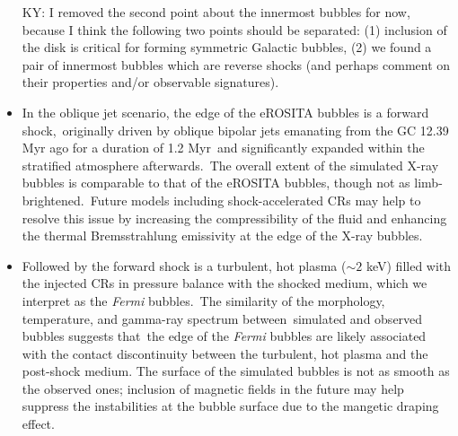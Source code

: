 \documentclass[fleqn,usenatbib,useAMS]{mnras}
\begin{document}
\begin{itemize}
      {\color{red} KY: I removed the second point about the innermost bubbles for now, because I think the following two points should be separated: (1) inclusion of the disk is critical for forming symmetric Galactic bubbles, (2) we found a pair of innermost bubbles which are reverse shocks (and perhaps comment on their properties and/or observable signatures).}
\item In the oblique jet scenario, the edge of the eROSITA bubbles is a forward shock,\
      originally driven by oblique bipolar jets emanating from the GC 12.39 Myr ago for a duration of 1.2 Myr\
      and significantly expanded within the stratified atmosphere afterwards.\
      The overall extent of the simulated X-ray bubbles is comparable to that of the eROSITA bubbles, though not as limb-brightened.\
      Future models including shock-accelerated CRs may help to resolve this issue by increasing the compressibility of the fluid and enhancing the thermal Bremsstrahlung emissivity at the edge of the X-ray bubbles.
\item Followed by the forward shock is a turbulent, hot plasma ($\sim2$ keV) filled with the injected CRs in pressure balance with the shocked medium, which we interpret as the \textit{Fermi} bubbles.\
      The similarity of the morphology, temperature, and gamma-ray spectrum between\
      simulated and observed bubbles suggests that\
      the edge of the \textit{Fermi} bubbles are likely associated with the contact discontinuity between the turbulent, hot plasma and the post-shock medium. The surface of the simulated bubbles is not as smooth as the observed ones; inclusion of magnetic fields in the future may help suppress the instabilities at the bubble surface due to the mangetic draping effect.

\end{itemize}
\end{document}
